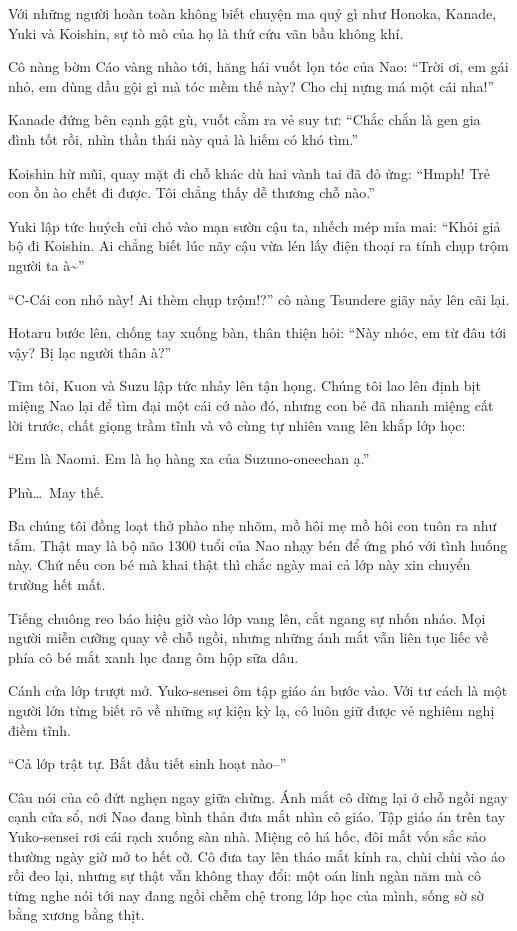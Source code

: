 \documentclass[../main.tex]{subfiles}
\begin{document}
Với những người hoàn toàn không biết chuyện ma quỷ gì như Honoka, Kanade, Yuki và Koishin, sự tò mò của họ là thứ cứu vãn bầu không khí.

Cô nàng bờm Cáo vàng nhào tới, hăng hái vuốt lọn tóc của Nao: ``Trời ơi, em gái nhỏ, em dùng dầu gội gì mà tóc mềm thế này? Cho chị nựng má một cái nha!''

Kanade đứng bên cạnh gật gù, vuốt cằm ra vẻ suy tư: ``Chắc chắn là gen gia đình tốt rồi, nhìn thần thái này quả là hiếm có khó tìm.''

Koishin hừ mũi, quay mặt đi chỗ khác dù hai vành tai đã đỏ ửng: ``Hmph! Trẻ con ồn ào chết đi được. Tôi chẳng thấy dễ thương chỗ nào.''

Yuki lập tức huých cùi chỏ vào mạn sườn cậu ta, nhếch mép mỉa mai: ``Khỏi giả bộ đi Koishin. Ai chẳng biết lúc nãy cậu vừa lén lấy điện thoại ra tính chụp trộm người ta à\~{}''

``C-Cái con nhỏ này! Ai thèm chụp trộm!?'' cô nàng Tsundere giãy nảy lên cãi lại.

Hotaru bước lên, chống tay xuống bàn, thân thiện hỏi: ``Này nhóc, em từ đâu tới vậy? Bị lạc người thân à?''

Tim tôi, Kuon và Suzu lập tức nhảy lên tận họng. Chúng tôi lao lên định bịt miệng Nao lại để tìm đại một cái cớ nào đó, nhưng con bé đã nhanh miệng cất lời trước, chất giọng trầm tĩnh và vô cùng tự nhiên vang lên khắp lớp học:

``Em là Naomi. Em là họ hàng xa của Suzuno-oneechan ạ.''

Phù\dots\ May thế.

Ba chúng tôi đồng loạt thở phào nhẹ nhõm, mồ hôi mẹ mồ hôi con tuôn ra như tắm. Thật may là bộ não 1300 tuổi của Nao nhạy bén để ứng phó với tình huống này. Chứ nếu con bé mà khai thật thì chắc ngày mai cả lớp này xin chuyển trường hết mất.

Tiếng chuông reo báo hiệu giờ vào lớp vang lên, cắt ngang sự nhốn nháo. Mọi người miễn cưỡng quay về chỗ ngồi, nhưng những ánh mắt vẫn liên tục liếc về phía cô bé mắt xanh lục đang ôm hộp sữa dâu.

Cánh cửa lớp trượt mở. Yuko-sensei ôm tập giáo án bước vào. Với tư cách là một người lớn từng biết rõ về những sự kiện kỳ lạ, cô luôn giữ được vẻ nghiêm nghị điềm tĩnh.

``Cả lớp trật tự. Bắt đầu tiết sinh hoạt nào--''

Câu nói của cô đứt nghẹn ngay giữa chừng. Ánh mắt cô dừng lại ở chỗ ngồi ngay cạnh cửa sổ, nơi Nao đang bình thản đưa mắt nhìn cô giáo. Tập giáo án trên tay Yuko-sensei rơi cái rạch xuống sàn nhà. Miệng cô há hốc, đôi mắt vốn sắc sảo thường ngày giờ mở to hết cỡ. Cô đưa tay lên tháo mắt kính ra, chùi chùi vào áo rồi đeo lại, nhưng sự thật vẫn không thay đổi: một oán linh ngàn năm mà cô từng nghe nói tới nay đang ngồi chễm chệ trong lớp học của mình, sống sờ sờ bằng xương bằng thịt.
\end{document}
